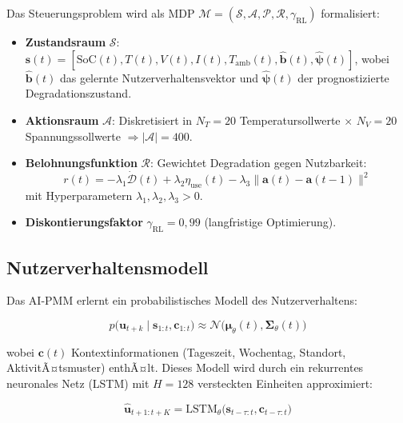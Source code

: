 ﻿\documentclass[12pt,a4paper]{article}
\begin{document}
	Das Steuerungsproblem wird als MDP $\mathcal{M} = (\mathcal{S}, \mathcal{A}, \mathcal{P}, \mathcal{R}, \gamma_\mathrm{RL})$
	formalisiert:
	
	\begin{itemize}[leftmargin=*]
		\item \textbf{Zustandsraum} $\mathcal{S}$: $\mathbf{s}(t) = [\text{SoC}(t), T(t), V(t), I(t),
		T_\mathrm{amb}(t), \hat{\mathbf{b}}(t), \hat{\boldsymbol{\psi}}(t)]$,
		wobei $\hat{\mathbf{b}}(t)$ das gelernte Nutzerverhaltensvektor und
		$\hat{\boldsymbol{\psi}}(t)$ der prognostizierte Degradationszustand.
		
		\item \textbf{Aktionsraum} $\mathcal{A}$: Diskretisiert in
		$N_T = 20$ Temperatursollwerte $\times$ $N_V = 20$ Spannungssollwerte
		$\Rightarrow |\mathcal{A}| = 400$.
		
		\item \textbf{Belohnungsfunktion} $\mathcal{R}$: Gewichtet Degradation
		gegen Nutzbarkeit:
		\begin{equation}
			r(t) = -\lambda_1 \dot{\mathcal{D}}(t) + \lambda_2 \eta_\mathrm{use}(t)
			- \lambda_3 \|\mathbf{a}(t) - \mathbf{a}(t-1)\|^2
			\label{eq:reward}
		\end{equation}
		mit Hyperparametern $\lambda_1, \lambda_2, \lambda_3 > 0$.
		
		\item \textbf{Diskontierungsfaktor} $\gamma_\mathrm{RL} = 0{,}99$ (langfristige Optimierung).
	\end{itemize}
	
	\subsection{Nutzerverhaltensmodell}
	
	Das AI-PMM erlernt ein probabilistisches Modell des Nutzerverhaltens:
	
	\begin{equation}
		p\bigl(\mathbf{u}_{t+k} \mid \mathbf{s}_{1:t}, \mathbf{c}_{1:t}\bigr)
		\approx \mathcal{N}\bigl(\boldsymbol{\mu}_\theta(t), \boldsymbol{\Sigma}_\theta(t)\bigr)
		\label{eq:user_model}
	\end{equation}
	
	wobei $\mathbf{c}(t)$ Kontextinformationen (Tageszeit, Wochentag, Standort,
	AktivitÃ¤tsmuster) enthÃ¤lt. Dieses Modell wird durch ein rekurrentes neuronales
	Netz (LSTM) mit $H = 128$ versteckten Einheiten approximiert:
	
	\begin{equation}
		\hat{\mathbf{u}}_{t+1:t+K} = \mathrm{LSTM}_\theta\bigl(\mathbf{s}_{t-\tau:t},
		\mathbf{c}_{t-\tau:t}\bigr)
		\label{eq:lstm_prediction}
	\end{equation}
	
\end{document}
